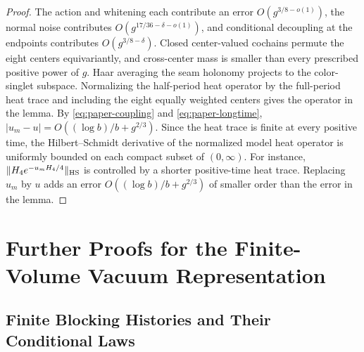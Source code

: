 \documentclass[11pt,a4paper]{article}
\numberwithin{equation}{section}
\begin{document}
\begin{proof}
The action and whitening each contribute an error \(O(g^{3/8-o(1)})\), the normal noise contributes \(O(g^{17/36-\delta-o(1)})\), and conditional decoupling at the endpoints contributes \(O(g^{3/8-\delta})\). Closed center-valued cochains permute the eight centers equivariantly, and cross-center mass is smaller than every prescribed positive power of \(g\). Haar averaging the seam holonomy projects to the color-singlet subspace. Normalizing the half-period heat operator by the full-period heat trace and including the eight equally weighted centers gives the operator in the lemma. By \eqref{eq:paper-coupling} and \eqref{eq:paper-longtime}, \(|u_m-u|=O((\log b)/b+g^{2/3})\). Since the heat trace is finite at every positive time, the Hilbert--Schmidt derivative of the normalized model heat operator is uniformly bounded on each compact subset of \((0,\infty)\). For instance, \(\|H_4 e^{-u_mH_4/4}\|_{\rm HS}\) is controlled by a shorter positive-time heat trace. Replacing \(u_m\) by \(u\) adds an error \(O((\log b)/b+g^{2/3})\) of smaller order than the error in the lemma.
\end{proof}
\section{Further Proofs for the Finite-Volume Vacuum Representation}
\label{app:cam-vacuum}

\subsection{Finite Blocking Histories and Their Conditional Laws}
\label{app:cam-fixed-law}
\end{document}
